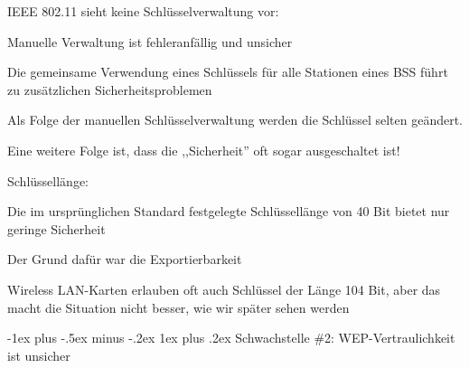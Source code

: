 \documentclass[a4paper]{article}
\makeatletter
\renewcommand{\subsubsection}{\@startsection{subsubsection}{3}{0mm}%
 {-1ex plus -.5ex minus -.2ex}%
 {1ex plus .2ex}%
 {\normalfont\small\bfseries}}
\makeatother
\begin{document}
\begin{multicols}{3}
      \begin{itemize*}
            \item IEEE 802.11 sieht keine Schlüsselverwaltung vor:
            \begin{itemize*}
                  \item Manuelle Verwaltung ist fehleranfällig und unsicher
                  \item Die gemeinsame Verwendung eines Schlüssels für alle Stationen eines BSS führt zu zusätzlichen Sicherheitsproblemen
                  \item Als Folge der manuellen Schlüsselverwaltung werden die Schlüssel selten geändert.
                  \item Eine weitere Folge ist, dass die ,,Sicherheit'' oft sogar ausgeschaltet ist!
            \end{itemize*}
            \item Schlüssellänge:
            \begin{itemize*}
                  \item Die im ursprünglichen Standard festgelegte Schlüssellänge von 40 Bit bietet nur geringe Sicherheit
                  \item Der Grund dafür war die Exportierbarkeit
                  \item Wireless LAN-Karten erlauben oft auch Schlüssel der Länge 104 Bit, aber das macht die Situation nicht besser, wie wir später sehen werden
            \end{itemize*}
      \end{itemize*}


      \subsubsection{Schwachstelle \#2: WEP-Vertraulichkeit ist
            unsicher}


\end{multicols}
\end{document}
